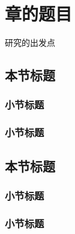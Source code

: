 \chapter{章的题目}
研究的出发点

\section{本节标题}

\subsection{小节标题}

\subsection{小节标题}

\section{本节标题}

\subsection{小节标题}

\subsection{小节标题}

